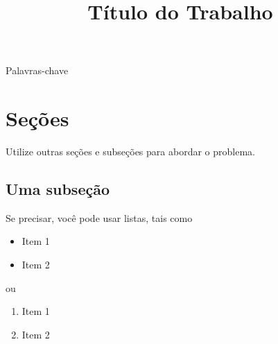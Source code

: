 \documentclass[twoside,conference,a4paper]{IEEEtran}
\begin{document}
	\renewcommand{\IEEEkeywordsname}{Palavras-chave}
	
	
	\title{Título do Trabalho}
	\author{%
	}
	
	
	\maketitle
	
	
	
	\begin{IEEEkeywords}
		Palavras-chave
	\end{IEEEkeywords}
	
	
	
	
	\section{Seções}
	
	Utilize outras seções e subseções para abordar o problema. 
	
	\subsection{Uma subseção}
	
	Se precisar, você pode usar listas, tais como
	
	\begin{itemize}
		\item Item 1
		\item Item 2
	\end{itemize}
	ou
	\begin{enumerate}
		\item Item 1
		\item Item 2
	\end{enumerate}
	
\end{document}

